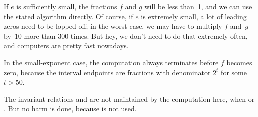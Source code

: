 If $e$ is sufficiently small, the fractions $f$ and $g$ will be less
than~1,
and we can use the stated algorithm directly. Of course, if $e$ is
extremely small, a lot of leading zeros need to be lopped off; in the
worst case, we may have to multiply $f$ and~$g$ by~10 more than 300 times.
But hey, we don't need to do that extremely often, and computers are
pretty fast nowadays.

In the small-exponent case, the computation always terminates before
$f$ becomes zero, because the interval endpoints are fractions with
denominator $2^t$ for some $t>50$.

The invariant relations  and  are
not maintained by the computation here, when  or %
.
But no harm is done, because  is not used.

